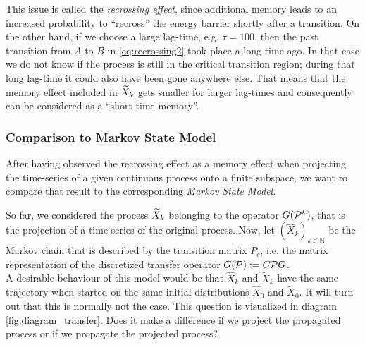 

This issue is called the \textit{recrossing effect}, since additional memory  leads to an increased probability to ``recross'' the energy barrier shortly after a transition. %
On the other hand, if we choose a large lag-time, e.g. $\tau = 100$, then the past transition from $A$ to $B$ in \eqref{eq:recrossing2} took place a long time ago. In that case we do not know if the process is still in the critical transition region; during that long lag-time it could also have been gone anywhere else. %
That means that the memory effect included in $\widetilde{X}_k$ gets smaller for larger lag-times and consequently can be considered as a ``short-time memory''. %

\subsubsection*{Comparison to Markov State Model}

After having observed the recrossing effect as a memory effect when projecting the time-series of a given continuous process onto a finite subspace, we want to compare that result to the corresponding \textit{Markov State Model}. %

So far, we considered the process $\widetilde{X}_k$ belonging to the operator $G(\mathcal{P}^k)$, that is the projection of a time-series of the original process.
Now, let $(\widehat{X}_k)_{k\in\mathbb{N}}$ be the Markov chain that is described by the transition matrix $P_c$, i.e. the matrix representation of the discretized transfer operator $G(\mathcal{P}) := G\mathcal{P} G$.
\\

A desirable behaviour of this model would be that $\widehat{X}_k$ and $\widetilde{X}_k$ have the same trajectory when started on the same initial distributions $\widehat{X}_0$ and $\widetilde{X}_0$. It will turn out that this is normally not the case. 
This question is visualized in diagram \ref{fig:diagram_transfer}.
Does it make a difference if we project the propagated process or if we propagate the projected process?

